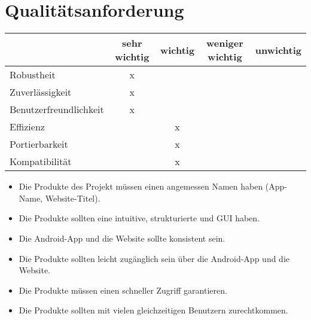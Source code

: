 \section{Qualitätsanforderung}
\begin{tabular}{|l|c|c|c|c|}
	\hline  & sehr wichtig  & wichtig & weniger wichtig & unwichtig \\ 
	\hline Robustheit  & x &  &  &  \\ 
	\hline Zuverlässigkeit & x &  &  &  \\ 
	\hline Benutzerfreundlichkeit & x &  &  &  \\ 
	\hline Effizienz &  & x &  &  \\ 
	\hline Portierbarkeit  & & x &  &  \\ 
	\hline Kompatibilität & & x &  &  \\ 
	\hline 
\end{tabular} 
\begin{itemize}
\item
Die Produkte des Projekt müssen einen angemessen Namen haben (App-Name, Website-Titel).
\item
Die Produkte sollten eine intuitive, strukturierte und  GUI haben.
\item
Die Android-App und die Website sollte konsistent sein.
\item
Die Produkte sollten leicht zugänglich sein über die Android-App und die Website.
\item
Die Produkte müssen einen schneller Zugriff garantieren.
\item
Die Produkte sollten mit vielen gleichzeitigen Benutzern zurechtkommen.
\end{itemize}
